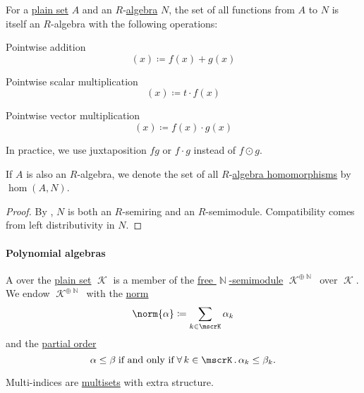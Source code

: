\begin{proposition}\label{thm:functions_over_algebra}
  For a \hyperref[def:set]{plain set} \( A \) and an \( R \)-\hyperref[def:algebra_over_semiring]{algebra} \( N \), the set of all functions from \( A \) to \( N \) is itself an \( R \)-algebra with the following operations:
  \begin{thmenum}
     Pointwise addition
    \begin{equation*}
      [f + g](x) \coloneqq f(x) + g(x)
    \end{equation*}

     Pointwise scalar multiplication
    \begin{equation*}
      [t \cdot f](x) \coloneqq t \cdot f(x)
    \end{equation*}

     Pointwise vector multiplication
    \begin{equation*}
      [f \odot g](x) \coloneqq f(x) \cdot g(x)
    \end{equation*}

    In practice, we use juxtaposition \( fg \) or \( f \cdot g \) instead of \( f \odot g \).
  \end{thmenum}

  If \( A \) is also an \( R \)-algebra, we denote the set of all \( R \)-\hyperref[def:algebra_over_semiring/homomorphism]{algebra homomorphisms} by \( \hom(A, N) \).
\end{proposition}
\begin{proof}
  By , \( N \) is both an \( R \)-semiring and an \( R \)-semimodule. Compatibility comes from left distributivity in \( N \).
\end{proof}

\paragraph{Polynomial algebras}

\begin{definition}\label{def:multi_index}\mimprovised
  A  over the \hyperref[def:set]{plain set} \( \mscrK \) is a member of the \hyperref[def:free_semimodule]{free \( \BbbN \)-semimodule} \( \mscrK^{\oplus \BbbN} \) over \( \mscrK \). We endow \( \mscrK^{\oplus \BbbN} \) with the \hyperref[def:norm]{norm}
  \begin{equation*}
    \norm{ \alpha } \coloneqq \sum_{k \in \mscrK} \alpha_k
  \end{equation*}
  and the \hyperref[def:partially_ordered_set]{partial order}
  \begin{equation*}
    \alpha \leq \beta \T{if and only if} \qforall {k \in \mscrK} \alpha_k \leq \beta_k.
  \end{equation*}
\end{definition}
\begin{comments}
  \item Multi-indices are \hyperref[def:labeled_set/multiset]{multisets} with extra structure.
\end{comments}

